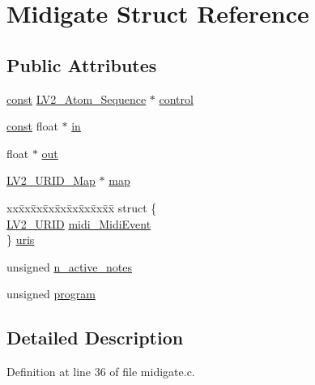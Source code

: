 \hypertarget{struct_midigate}{}\section{Midigate Struct Reference}
\label{struct_midigate}
\subsection*{Public Attributes}
\begin{DoxyCompactItemize}
\item 
\hyperlink{getopt1_8c_a2c212835823e3c54a8ab6d95c652660e}{const} \hyperlink{struct_l_v2___atom___sequence}{L\+V2\+\_\+\+Atom\+\_\+\+Sequence} $\ast$ \hyperlink{struct_midigate_a35c654d5e8e01aad7dbce9d88e6d51ea}{control}
\item 
\hyperlink{getopt1_8c_a2c212835823e3c54a8ab6d95c652660e}{const} float $\ast$ \hyperlink{struct_midigate_a4f074dfde3d9b0be324745fccca29590}{in}
\item 
float $\ast$ \hyperlink{struct_midigate_a63f302c6e89baac690e7b0b41101bf92}{out}
\item 
\hyperlink{urid_8h_afefb42cd271f750506a8739f73c098c5}{L\+V2\+\_\+\+U\+R\+I\+D\+\_\+\+Map} $\ast$ \hyperlink{struct_midigate_ad84aafd7d3c3b34d267dfb68c36586bd}{map}
\item 
\begin{tabbing}
xx\=xx\=xx\=xx\=xx\=xx\=xx\=xx\=xx\=\kill
struct \{\\
\>\hyperlink{urid_8h_a5ff0630d245539e9f6dca10ff3c40fae}{LV2\_URID} \hyperlink{struct_midigate_a6d1fa95568c053c1c8ddb9a80683fbdf}{midi\_MidiEvent}\\
\} \hyperlink{struct_midigate_aa00b90d0d71556c90937b3c1b16192a0}{uris}\\

\end{tabbing}\item 
unsigned \hyperlink{struct_midigate_accba6d19a58619d3d17d0255a374fcbc}{n\+\_\+active\+\_\+notes}
\item 
unsigned \hyperlink{struct_midigate_ad140aebedaeebbfbe99d58fe994394d1}{program}
\end{DoxyCompactItemize}


\subsection{Detailed Description}


Definition at line 36 of file midigate.\+c.



